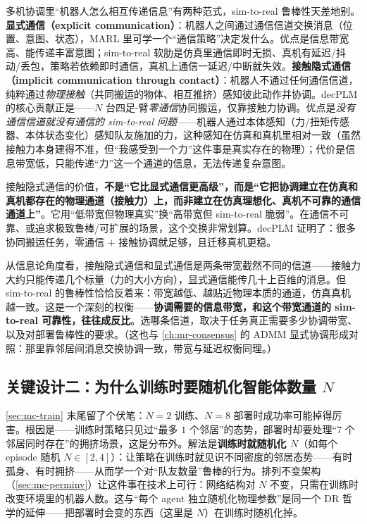 多机协调里“机器人怎么相互传递信息”有两种范式，sim-to-real 鲁棒性天差地别。\textbf{显式通信（explicit communication）}：机器人之间通过通信信道交换消息（位置、意图、状态），MARL 里可学一个“通信策略”决定发什么。优点是信息带宽高、能传递丰富意图；sim-to-real 软肋是仿真里通信即时无损、真机有延迟/抖动/丢包，策略若依赖即时通信，真机上通信一延迟/中断就失效。\textbf{接触隐式通信（implicit communication through contact）}：机器人不通过任何通信信道，纯粹通过\emph{物理接触}（共同搬运的物体、相互推挤）感知彼此动作并协调。decPLM 的核心贡献正是——$N$ 台四足-臂\emph{零通信}协同搬运，仅靠接触力协调\cite{pandit2025decplm}。优点是\emph{没有通信信道就没有通信的 sim-to-real 问题}——机器人通过本体感知（力/扭矩传感器、本体状态变化）感知队友施加的力，这种感知在仿真和真机里相对一致（虽然接触力本身建得不准，但“我感受到一个力”这件事是真实存在的物理）；代价是信息带宽低，只能传递“力”这一个通道的信息，无法传递复杂意图。

\begin{insight}
接触隐式通信的价值，\textbf{不是“它比显式通信更高级”，而是“它把协调建立在仿真和真机都存在的物理通道（接触力）上，而非建立在仿真理想化、真机不可靠的通信通道上”}。它用“低带宽但物理真实”换“高带宽但 sim-to-real 脆弱”。在通信不可靠、或追求极致鲁棒/可扩展的场景，这个交换非常划算。decPLM 证明了：很多协同搬运任务，零通信 $+$ 接触协调就足够，且迁移真机更稳。
\end{insight}

\begin{insight}
从信息论角度看，接触隐式通信和显式通信是两条带宽截然不同的信道——接触力大约只能传递几个标量（力的大小方向），显式通信能传几十上百维的消息。但 sim-to-real 的鲁棒性恰恰反着来：带宽越低、越贴近物理本质的通道，仿真真机越一致。这是一个深刻的权衡——\textbf{协调需要的信息带宽，和这个带宽通道的 sim-to-real 可靠性，往往成反比}。选哪条信道，取决于任务真正需要多少协调带宽、以及对部署鲁棒性的要求。（这也与 \cref{ch:mr-consensus} 的 ADMM 显式协调形成对照：那里靠邻居间消息交换协调一致，带宽与延迟权衡同理。）
\end{insight}

\subsection{关键设计二：为什么训练时要随机化智能体数量 \texorpdfstring{$N$}{N}}
\label{sec:mc-n-random}

\cref{sec:mc-train} 末尾留了个伏笔：$N{=}2$ 训练、$N{=}8$ 部署时成功率可能掉得厉害。根因是——训练时策略只见过“最多 $1$ 个邻居”的态势，部署时却要处理“$7$ 个邻居同时存在”的拥挤场景，这是分布外。解法是\textbf{训练时就随机化 $N$}（如每个 episode 随机 $N\in[2,4]$）：让策略在训练时就见识不同密度的邻居态势——有时孤身、有时拥挤——从而学一个对“队友数量”鲁棒的行为。排列不变架构（\cref{sec:mc-perminv}）让这件事在技术上可行：网络结构对 $N$ 不变，只需在训练时改变环境里的机器人数。这与“每个 agent 独立随机化物理参数”是同一个 DR 哲学的延伸——把部署时会变的东西（这里是 $N$）在训练时随机化掉。

